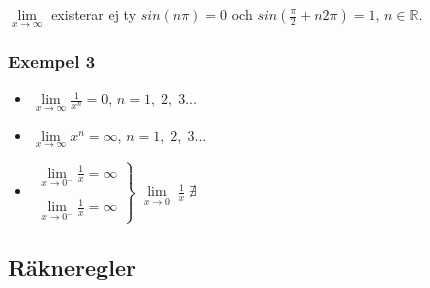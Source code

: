 \documentclass[swedish]{article}
\begin{document}
$\lim\limits_{x\to \infty}$ existerar ej ty $sin(n\pi) = 0$ och $sin\left(\frac{\pi}{2} + n2\pi \right) = 1$, $n\in \mathbb{R}$.

\subsubsection{Exempel 3}

\begin{itemize}
    \item{\; $\lim\limits_{x\to \infty} \frac{1}{x^n} = 0$,\; $n = 1,\; 2,\; 3...$}
    \item{\; $\lim\limits_{x\to \infty} x^n = \infty$,\; $n = 1,\; 2,\; 3...$}
    \item{$\left. \begin{array}{l}
    \lim\limits_{x\to 0^-} \frac{1}{x} = \infty\\
    \\
    \lim\limits_{x\to 0^-} \frac{1}{x} = \infty
    \end{array} \right\}$} $\lim\limits_{x\to 0} \; \frac{1}{x} \; \nexists$
\end{itemize}

\subsection{Räkneregler}
\end{document}
